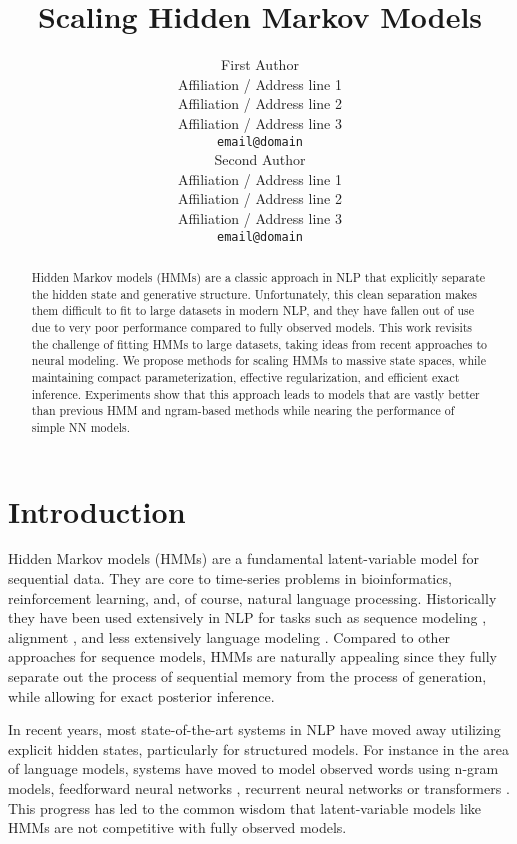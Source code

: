 \documentclass[11pt,a4paper]{article}
\title{Scaling Hidden Markov Models}
\author{First Author \\
  Affiliation / Address line 1 \\
  Affiliation / Address line 2 \\
  Affiliation / Address line 3 \\
  \texttt{email@domain} \\\And
  Second Author \\
  Affiliation / Address line 1 \\
  Affiliation / Address line 2 \\
  Affiliation / Address line 3 \\
  \texttt{email@domain} \\}
\date{}
\begin{document}
\maketitle
\begin{abstract}
Hidden Markov models (HMMs) are a classic approach in NLP that 
explicitly separate the hidden state and generative structure.
Unfortunately, this clean separation makes them difficult to fit to large datasets in modern NLP, 
and they have fallen out of use due to very poor performance 
compared to fully observed models. This work revisits the challenge of 
fitting HMMs to large datasets, taking ideas from recent approaches to neural modeling.
We propose methods for scaling HMMs to massive state spaces, while maintaining compact parameterization, effective regularization, and efficient exact inference. Experiments show that this approach leads to models that are vastly better than previous HMM and ngram-based methods while nearing the performance of 
simple NN models. 
\end{abstract}

\section{Introduction}


Hidden Markov models (HMMs) are a fundamental latent-variable model for sequential data.
They are core to time-series problems in bioinformatics, reinforcement learning, and,
of course, natural language processing.
Historically they have been used extensively in NLP for tasks such as
sequence modeling \citep{rabiner1990tut}, alignment \citep{vogel1996hmm},
and less extensively language modeling \citep{kuhn1994hmmlm,huang2011thesis}. 
Compared to other approaches for sequence models, HMMs are naturally appealing since they 
fully separate out the process of sequential memory from the process of generation, while allowing for 
exact posterior inference. 



In recent years, most state-of-the-art systems in NLP have moved away utilizing explicit hidden states,
particularly for structured models. For instance in the area of language models, systems have moved to model observed words using n-gram models, feedforward neural networks \citep{bengio2003nlm}, recurrent neural networks \citep{mikolov2010rnn,zaremba2014lstm,merity2017awdlstm}
or transformers \citep{radford2019language}.
This progress has led to the common wisdom that latent-variable models like HMMs are not
competitive with fully observed models.
\end{document}
